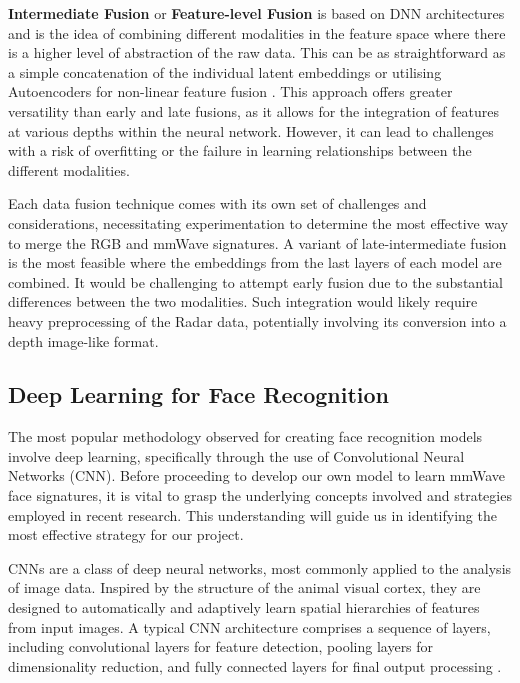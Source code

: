 \documentclass{interim}
\begin{document}
\textbf{Intermediate Fusion} or \textbf{Feature-level Fusion} is based on DNN architectures and is the idea of combining different modalities in the feature space where there is a higher level of abstraction of the raw data. This can be as straightforward as a simple concatenation of the individual latent embeddings or utilising Autoencoders for non-linear feature fusion \cite{charte2018practical}. This approach offers greater versatility than early and late fusions, as it allows for the integration of features at various depths within the neural network. However, it can lead to challenges with a risk of overfitting or the failure in learning relationships between the different modalities.

Each data fusion technique comes with its own set of challenges and considerations, necessitating experimentation to determine the most effective way to merge the RGB and mmWave signatures. A variant of late-intermediate fusion is the most feasible where the embeddings from the last layers of each model are combined. It would be challenging to attempt early fusion due to the substantial differences between the two modalities. Such integration would likely require heavy preprocessing of the Radar data, potentially involving its conversion into a depth image-like format. 


\subsection{Deep Learning for Face Recognition}
The most popular methodology observed for creating face recognition models involve deep learning, specifically through the use of Convolutional Neural Networks (CNN). Before proceeding to develop our own model to learn mmWave face signatures, it is vital to grasp the underlying concepts involved and strategies employed in recent research. This understanding will guide us in identifying the most effective strategy for our project.

CNNs are a class of deep neural networks, most commonly applied to the analysis of image data. Inspired by the structure of the animal visual cortex, they are designed to automatically and adaptively learn spatial hierarchies of features from input images. A typical CNN architecture comprises a sequence of layers, including convolutional layers for feature detection, pooling layers for dimensionality reduction, and fully connected layers for final output processing \cite{o2015introduction}.
\end{document}
